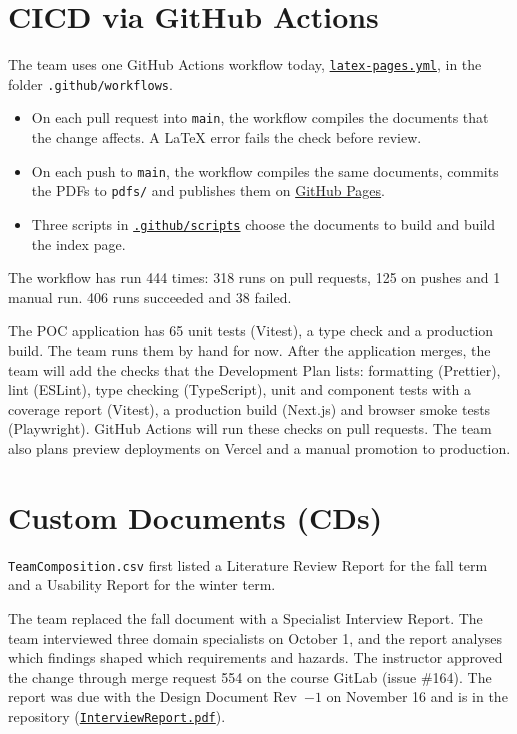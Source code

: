 \documentclass{article}
\begin{document}
\section{CICD via GitHub Actions}

The team uses one GitHub Actions workflow today,
\href{https://github.com/AHMEDELZARIA/squigglr/blob/main/.github/workflows/latex-pages.yml}
{\texttt{latex-pages.yml}}, in the folder \texttt{.github/workflows}.

\begin{itemize}
    \item On each pull request into \texttt{main}, the workflow compiles the
    documents that the change affects. A LaTeX error fails the check before
    review.
    \item On each push to \texttt{main}, the workflow compiles the same
    documents, commits the PDFs to \texttt{pdfs/} and publishes them on
    \href{https://ahmedelzaria.github.io/squigglr/}{GitHub Pages}.
    \item Three scripts in
    \href{https://github.com/AHMEDELZARIA/squigglr/tree/main/.github/scripts}
    {\texttt{.github/scripts}} choose the documents to build and build the
    index page.
\end{itemize}

The workflow has run 444 times: 318 runs on pull requests, 125 on pushes and
1 manual run. 406 runs succeeded and 38 failed.

The POC application has 65 unit tests (Vitest), a type check and a
production build. The team runs them by hand for now. After the application
merges, the team will add the checks that the Development Plan lists:
formatting (Prettier), lint (ESLint), type checking (TypeScript), unit and
component tests with a coverage report (Vitest), a production build
(Next.js) and browser smoke tests (Playwright). GitHub Actions will run
these checks on pull requests. The team also plans preview deployments on
Vercel and a manual promotion to production.

\section{Custom Documents (CDs)}

\texttt{TeamComposition.csv} first listed a Literature Review Report for the
fall term and a Usability Report for the winter term.

The team replaced the fall document with a Specialist Interview Report. The
team interviewed three domain specialists on October 1, and the report
analyses which findings shaped which requirements and hazards. The
instructor approved the change through merge request 554 on the course
GitLab (issue \#164). The report was due with the Design Document Rev~$-1$
on November 16 and is in the repository
(\href{https://github.com/AHMEDELZARIA/squigglr/blob/main/pdfs/CDs/Interviews/InterviewReport.pdf}
{\texttt{InterviewReport.pdf}}).
\end{document}
